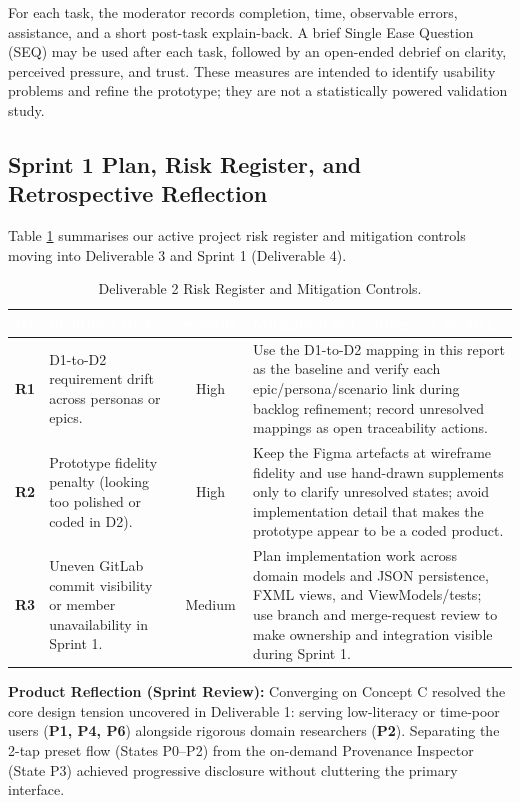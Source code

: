 \documentclass[12pt, a4paper]{article}
\begin{document}
For each task, the moderator records completion, time, observable errors, assistance, and a short post-task explain-back. A brief Single Ease Question (SEQ) may be used after each task, followed by an open-ended debrief on clarity, perceived pressure, and trust. These measures are intended to identify usability problems and refine the prototype; they are not a statistically powered validation study.

\subsection{Sprint 1 Plan, Risk Register, and Retrospective Reflection}
Table \ref{tab:risk-log} summarises our active project risk register and mitigation controls moving into Deliverable 3 and Sprint 1 (Deliverable 4).

\begin{table}[H]
\centering
\small
\renewcommand{\arraystretch}{1.35}
\begin{tabularx}{\textwidth}{@{} p{1.2cm} p{3.4cm} c X @{}}
\toprule
\rowcolor{AcademicNavy}
\textcolor{white}{\textbf{ID}} & \textcolor{white}{\textbf{Identified Risk}} & \textcolor{white}{\textbf{Severity}} & \textcolor{white}{\textbf{Mitigation \& Contingency Strategy}} \\
\midrule
\textbf{R1} & D1-to-D2 requirement drift across personas or epics. & High & Use the D1-to-D2 mapping in this report as the baseline and verify each epic/persona/scenario link during backlog refinement; record unresolved mappings as open traceability actions. \\
\rowcolor{RowAlt}
\textbf{R2} & Prototype fidelity penalty (looking too polished or coded in D2). & High & Keep the Figma artefacts at wireframe fidelity and use hand-drawn supplements only to clarify unresolved states; avoid implementation detail that makes the prototype appear to be a coded product. \\
\textbf{R3} & Uneven GitLab commit visibility or member unavailability in Sprint 1. & Medium & Plan implementation work across domain models and JSON persistence, FXML views, and ViewModels/tests; use branch and merge-request review to make ownership and integration visible during Sprint 1. \\
\bottomrule
\end{tabularx}
\caption{Deliverable 2 Risk Register and Mitigation Controls.}
\label{tab:risk-log}
\end{table}

\textbf{Product Reflection (Sprint Review):} Converging on Concept C resolved the core design tension uncovered in Deliverable 1: serving low-literacy or time-poor users (\textbf{P1, P4, P6}) alongside rigorous domain researchers (\textbf{P2}). Separating the 2-tap preset flow (States P0--P2) from the on-demand Provenance Inspector (State P3) achieved progressive disclosure without cluttering the primary interface.
\end{document}
